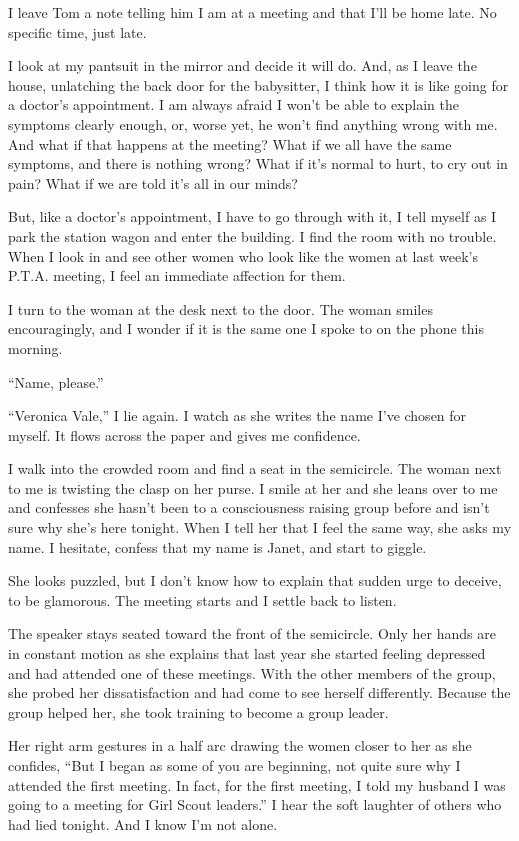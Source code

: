 \documentclass[twoside,10pt]{book}
\begin{document}
I leave Tom a note telling him I am at a meeting and that I'll be home
late. No specific time, just late.

I look at my pantsuit in the mirror and decide it will do. And, as I
leave the house, unlatching the back door for the babysitter, I think
how it is like going for a doctor's appointment. I am always afraid I
won't be able to explain the symptoms clearly enough, or, worse yet, he
won't find anything wrong with me. And what if that happens at the
meeting? What if we all have the same symptoms, and there is nothing
wrong? What if it's normal to hurt, to cry out in pain? What if we are
told it's all in our minds?

But, like a doctor's appointment, I have to go through with it, I tell
myself as I park the station wagon and enter the building. I find the
room with no trouble. When I look in and see other women who look like
the women at last week's P.T.A. meeting, I feel an immediate affection
for them.

I turn to the woman at the desk next to the door. The woman smiles
encouragingly, and I wonder if it is the same one I spoke to on the
phone this morning.

``Name, please.''

``Veronica Vale,'' I lie again. I watch as she writes the name I've
chosen for myself. It flows across the paper and gives me confidence.

I walk into the crowded room and find a seat in the semicircle. The
woman next to me is twist­ing the clasp on her purse. I smile at her and
she leans over to me and confesses she hasn't been to a consciousness
raising group before and isn't sure why she's here tonight. When I tell
her that I feel the same way, she asks my name. I hesitate, confess that
my name is Janet, and start to giggle.

She looks puzzled, but I don't know how to explain that sudden urge to
deceive, to be glamor­ous. The meeting starts and I settle back to
listen.

The speaker stays seated toward the front of the semicircle. Only her
hands are in constant motion as she explains that last year she started
feeling depressed and had attended one of these meet­ings. With the
other members of the group, she probed her dissatisfaction and had come
to see her­self differently. Because the group helped her, she took
training to become a group leader.

Her right arm gestures in a half arc drawing the women closer to her as
she confides, ``But I began as some of you are beginning, not quite sure
why I attended the first meeting. In fact, for the first meeting, I told
my husband I was going to a meeting for Girl Scout leaders.'' I hear the
soft laugh­ter of others who had lied tonight. And I know I'm not alone.
\end{document}
